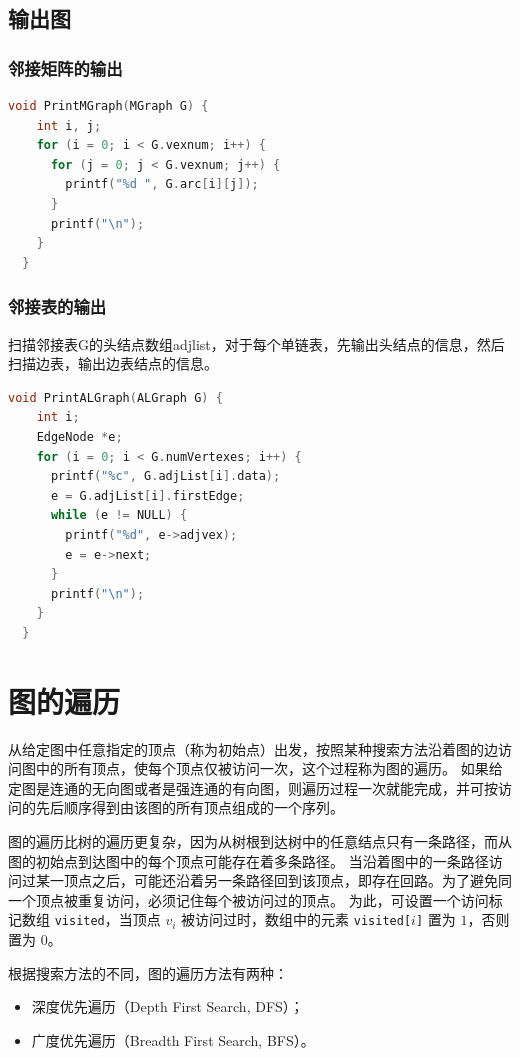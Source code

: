 \documentclass[lang=cn,newtx,10pt,scheme=chinese]{../elegantbook}
\begin{document}
\subsection{输出图}

\subsubsection{邻接矩阵的输出}

\begin{lstlisting}[language=C++, caption={邻接矩阵的输出}]
  void PrintMGraph(MGraph G) {
    int i, j;
    for (i = 0; i < G.vexnum; i++) {
      for (j = 0; j < G.vexnum; j++) {
        printf("%d ", G.arc[i][j]);
      }
      printf("\n");
    }
  }
\end{lstlisting}

\subsubsection{邻接表的输出}

扫描邻接表G的头结点数组adjlist，对于每个单链表，先输出头结点的信息，然后扫描边表，输出边表结点的信息。
\begin{lstlisting}[language=C++, caption={邻接表的输出}]
  void PrintALGraph(ALGraph G) {
    int i;
    EdgeNode *e;
    for (i = 0; i < G.numVertexes; i++) {
      printf("%c", G.adjList[i].data);
      e = G.adjList[i].firstEdge;
      while (e != NULL) {
        printf("%d", e->adjvex);
        e = e->next;
      }
      printf("\n");
    }
  }
\end{lstlisting}


\section{图的遍历}
从给定图中任意指定的顶点（称为初始点）出发，按照某种搜索方法沿着图的边访问图中的所有顶点，使每个顶点仅被访问一次，这个过程称为图的遍历。
如果给定图是连通的无向图或者是强连通的有向图，则遍历过程一次就能完成，并可按访问的先后顺序得到由该图的所有顶点组成的一个序列。

图的遍历比树的遍历更复杂，因为从树根到达树中的任意结点只有一条路径，而从图的初始点到达图中的每个顶点可能存在着多条路径。
当沿着图中的一条路径访问过某一顶点之后，可能还沿着另一条路径回到该顶点，即存在回路。为了避免同一个顶点被重复访问，必须记住每个被访问过的顶点。
为此，可设置一个访问标记数组 \texttt{visited}，当顶点 $v_i$ 被访问过时，数组中的元素 \texttt{visited[$i$]} 置为 $1$，否则置为 $0$。

根据搜索方法的不同，图的遍历方法有两种：
\begin{itemize}
  \item 深度优先遍历（Depth First Search, DFS）；
  \item 广度优先遍历（Breadth First Search, BFS）。
\end{itemize}
\end{document}
